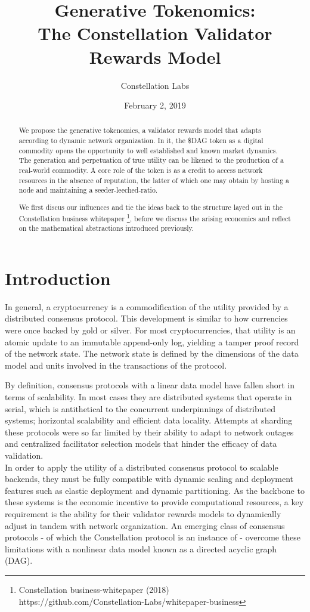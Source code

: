 \documentclass{article}
\title{Generative Tokenomics:\\ The Constellation Validator Rewards Model}
\author{Constellation Labs}
\date{February 2, 2019}
\begin{document}
\maketitle

\begin{abstract}
We propose the generative tokenomics, a validator rewards model that adapts according to dynamic network organization. In it, the \$DAG token as a digital commodity opens the opportunity to well established and known market dynamics. The generation and perpetuation of true utility can be likened to the production of a real-world commodity. A core role of the token is as a credit to access network resources in the absence of reputation, the latter of which one may obtain by hosting a node and maintaining a seeder-leeched-ratio.

We first discus our influences and tie the ideas back to the structure layed out in the Constellation business whitepaper
\footnote{Constellation business-whitepaper (2018)\\ https://github.com/Constellation-Labs/whitepaper-business}, 
before we discuss the arising economics and reflect on the mathematical abstractions introduced previously. 
\end{abstract}

\setcounter{secnumdepth}{0}
\section{Introduction}
In general, a cryptocurrency is a commodification of the utility provided by a distributed consensus protocol. This development is similar to how currencies were once backed by gold or silver. For most cryptocurrencies, that utility is an atomic update to an immutable append-only log, yielding a tamper proof record of the network state. The network state is defined by the dimensions of the data model and units involved in the transactions of the protocol. 

By definition, consensus protocols with a linear data model have fallen short in terms of scalability. In most cases they are distributed systems that operate in serial, which is antithetical to the concurrent underpinnings of distributed systems; horizontal scalability and efficient data locality. Attempts at sharding these protocols were so far limited by their ability to adapt to network outages and centralized facilitator selection models that hinder the efficacy of data validation. \\
In order to apply the utility of a distributed consensus protocol to scalable backends, they must be fully compatible with dynamic scaling and deployment features such as elastic deployment and dynamic partitioning. As the backbone to these systems is the economic incentive to provide computational resources, a key requirement is the ability for their validator rewards models to dynamically adjust in tandem with network organization. An emerging class of consensus protocols - of which the Constellation protocol is an instance of - overcome these limitations with a nonlinear data model known as a directed acyclic graph (DAG).
\end{document}

